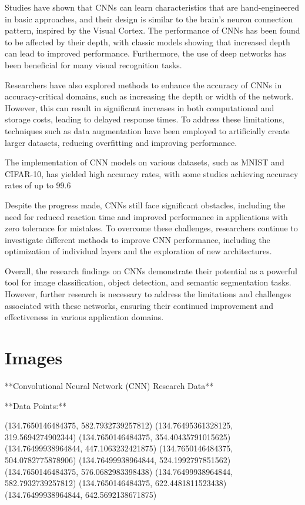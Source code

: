 \documentclass[a4paper,twocolumn]{article}%
\begin{document}
Studies have shown that CNNs can learn characteristics that are hand-engineered in basic approaches, and their design is similar to the brain's neuron connection pattern, inspired by the Visual Cortex. The performance of CNNs has been found to be affected by their depth, with classic models showing that increased depth can lead to improved performance. Furthermore, the use of deep networks has been beneficial for many visual recognition tasks.

Researchers have also explored methods to enhance the accuracy of CNNs in accuracy-critical domains, such as increasing the depth or width of the network. However, this can result in significant increases in both computational and storage costs, leading to delayed response times. To address these limitations, techniques such as data augmentation have been employed to artificially create larger datasets, reducing overfitting and improving performance.

The implementation of CNN models on various datasets, such as MNIST and CIFAR-10, has yielded high accuracy rates, with some studies achieving accuracy rates of up to 99.6%

Despite the progress made, CNNs still face significant obstacles, including the need for reduced reaction time and improved performance in applications with zero tolerance for mistakes. To overcome these challenges, researchers continue to investigate different methods to improve CNN performance, including the optimization of individual layers and the exploration of new architectures.

Overall, the research findings on CNNs demonstrate their potential as a powerful tool for image classification, object detection, and semantic segmentation tasks. However, further research is necessary to address the limitations and challenges associated with these networks, ensuring their continued improvement and effectiveness in various application domains.

%
\section*{Images}%
\label{sec:Images}%
**Convolutional Neural Network (CNN) Research Data**

**Data Points:**

(134.7650146484375, 582.7932739257812)
(134.76495361328125, 319.5694274902344)
(134.7650146484375, 354.40435791015625)
(134.76499938964844, 447.1063232421875)
(134.7650146484375, 504.0782775878906)
(134.76499938964844, 524.1992797851562)
(134.7650146484375, 576.0682983398438)
(134.76499938964844, 582.7932739257812)
(134.7650146484375, 622.4481811523438)
(134.76499938964844, 642.5692138671875)
\end{document}
